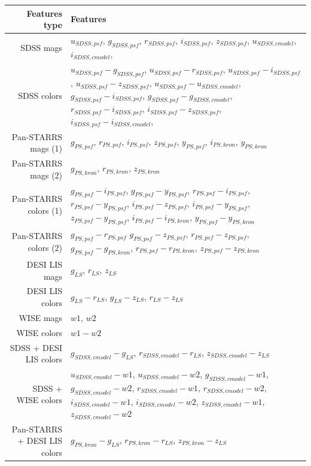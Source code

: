 \documentclass[fleqn,usenatbib]{mnras}
\begin{document}
\begin{table}
	\begin{tabular}{ r p{10cm} }
	\hline
	    Features type & Features \\
    \hline
        SDSS mags & \(u_{SDSS,psf}\), \(g_{SDSS,psf}\), \(r_{SDSS,psf}\), \(i_{SDSS,psf}\), \(z_{SDSS,psf}\), \(u_{SDSS,cmodel}\), \(i_{SDSS,cmodel}\), \\
        SDSS colors & \(u_{SDSS,psf}-g_{SDSS,psf}\), \(u_{SDSS,psf}-r_{SDSS,psf}\), \(u_{SDSS,psf}-i_{SDSS,psf}\), \(u_{SDSS,psf}-z_{SDSS,psf}\), \(u_{SDSS,psf}-u_{SDSS,cmodel}\), \(g_{SDSS,psf}-i_{SDSS,psf}\), \(g_{SDSS,psf}-g_{SDSS,cmodel}\), \(r_{SDSS,psf}-i_{SDSS,psf}\), \(i_{SDSS,psf}-z_{SDSS,psf}\), \(i_{SDSS,psf}-i_{SDSS,cmodel}\), \\
    \hline
        Pan-STARRS mags (1) & \(g_{PS,psf}\), \(r_{PS,psf}\), \(i_{PS,psf}\), \(z_{PS,psf}\), \(y_{PS,psf}\), \(i_{PS,kron}\), \(y_{PS,kron}\) \\
        Pan-STARRS mags (2) & \(g_{PS,kron}\), \(r_{PS,kron}\), \(z_{PS,kron}\) \\
        Pan-STARRS colors (1) & \(g_{PS,psf}-i_{PS,psf}\), \(g_{PS,psf}-y_{PS,psf}\), \(r_{PS,psf}-i_{PS,psf}\), \(r_{PS,psf}-y_{PS,psf}\), \(i_{PS,psf}-z_{PS,psf}\), \(i_{PS,psf}-y_{PS,psf}\), \(z_{PS,psf}-y_{PS,psf}\), \(i_{PS,psf}-i_{PS,kron}\), \(y_{PS,psf}-y_{PS,kron}\) \\
        Pan-STARRS colors (2) & \(g_{PS,psf}-r_{PS,psf}\) \(g_{PS,psf}-z_{PS,psf}\), \(r_{PS,psf}-z_{PS,psf}\), \(g_{PS,psf}-g_{PS,kron}\), \(r_{PS,psf}-r_{PS,kron}\), \(z_{PS,psf}-z_{PS,kron}\) \\
    \hline
        DESI LIS mags & \(g_{LS}\), \(r_{LS}\), \(z_{LS}\) \\
        DESI LIS colors & \(g_{LS}-r_{LS}\), \(g_{LS}-z_{LS}\), \(r_{LS}-z_{LS}\) \\
    \hline
        WISE mags & \(w1\), \(w2\) \\
        WISE colors & \(w1-w2\) \\
    \hline
        SDSS + DESI LIS colors & \(g_{SDSS,cmodel}-g_{LS}\), \(r_{SDSS,cmodel}-r_{LS}\), \(z_{SDSS,cmodel}-z_{LS}\) \\
        SDSS + WISE colors & \(u_{SDSS,cmodel}-w1\), \(u_{SDSS,cmodel}-w2\), \(g_{SDSS,cmodel}-w1\), \(g_{SDSS,cmodel}-w2\), \(r_{SDSS,cmodel}-w1\), \(r_{SDSS,cmodel}-w2\), \(i_{SDSS,cmodel}-w1\), \(i_{SDSS,cmodel}-w2\), \(z_{SDSS,cmodel}-w1\), \(z_{SDSS,cmodel}-w2\) \\
        Pan-STARRS + DESI LIS colors & \(g_{PS,kron}-g_{LS}\), \(r_{PS,kron}-r_{LS}\), \(z_{PS,kron}-z_{LS}\) \\

\end{tabular}
\end{table}
\end{document}
